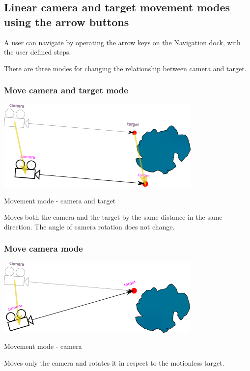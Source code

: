\subsection{Linear camera and target movement modes using the arrow
buttons}\label{linear-camera-and-target-movement-modes-using-the-arrow-buttons}

A user can navigate by operating the arrow keys on the Navigation dock,
with the user defined steps.

There are three modes for changing the relationship between camera and
target.

\subsubsection{Move camera and target
mode}\label{move-camera-and-target-mode}

\includegraphics[width=3.95347in,height=1.75556in]{img/manual/media/image11.png}

Movement mode - camera and target

Moves both the camera and the target by the same distance in the same
direction. The angle of camera rotation does not change.

\subsubsection{Move camera mode}\label{move-camera-mode}

\includegraphics[width=3.95347in,height=1.48819in]{img/manual/media/image12.png}

Movement mode - camera

Moves only the camera and rotates it in respect to the motionless
target.

